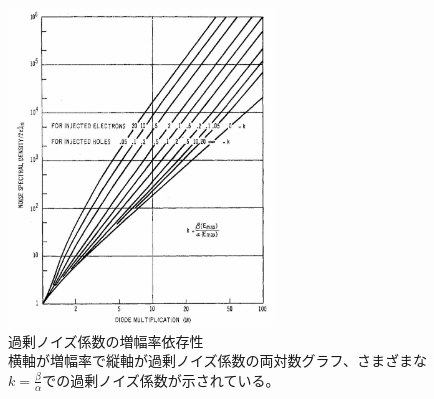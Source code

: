 \begin{figure}[h]
    \centering
    \includegraphics[width=7cm]{fig/ch3/Multiplication_Noise.jpg}
    \caption[過剰ノイズ係数の増幅率依存性\cite{1363388845924852224}]{過剰ノイズ係数の増幅率依存性\cite{1363388845924852224}\\横軸が増幅率で縦軸が過剰ノイズ係数の両対数グラフ、さまざまな$k=\frac{\beta}{\alpha}$での過剰ノイズ係数が示されている。}
    \label{fg:Multiplication_Noise}
\end{figure}

